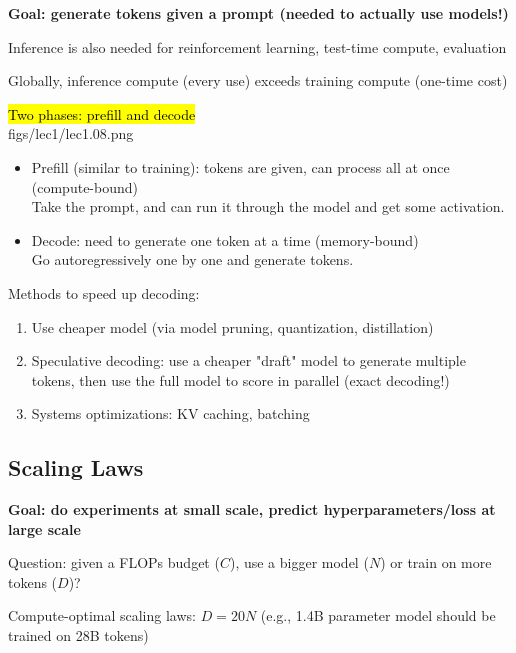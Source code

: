 \textbf{{\color{tred}Goal: generate tokens given a prompt (needed to actually use models!)}}

Inference is also needed for reinforcement learning, test-time compute, evaluation

Globally, inference compute (every use) exceeds training compute (one-time cost)

\hl{Two phases: prefill and decode}\\

\MarginImageWithNote
  {figs/lec1/lec1.08.png}
  {}
  
\vspace{1em}

\begin{itemize}
    \item Prefill (similar to training): tokens are given, can process all at once (compute-bound)
    \\
    Take the prompt, and can run it through the model and get some activation.
    \item Decode: need to generate one token at a time (memory-bound)\\
    Go autoregressively one by one and generate tokens.
\end{itemize}

\vspace{1em}

Methods to speed up decoding:
    \begin{enumerate}
        \item Use cheaper model (via model pruning, quantization, distillation)
        \item Speculative decoding: use a cheaper "draft" model to generate multiple tokens, then use the full model to score in parallel (exact decoding!)
        \item Systems optimizations: KV caching, batching
    \end{enumerate}

\subsection{Scaling Laws}
\textbf{{\color{tred} Goal: do experiments at small scale, predict hyperparameters/loss at large scale
}}

Question: given a FLOPs budget ($C$), use a bigger model ($N$) or train on more tokens ($D$)?

Compute-optimal scaling laws: $D = 20 N$ (e.g., 1.4B parameter model should be trained on 28B tokens)

